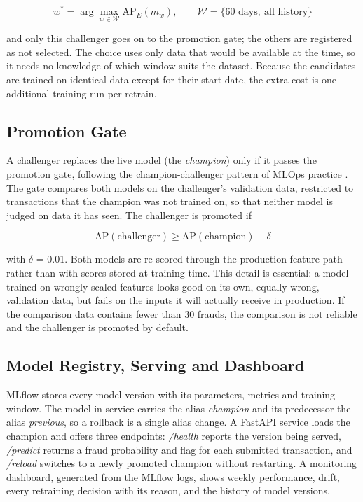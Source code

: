 \begin{equation}
  w^{*} = \arg\max_{w \in \mathcal{W}} \mathrm{AP}_{E}(m_w), \qquad \mathcal{W} = \{\text{60 days},\ \text{all history}\}
  \label{eq:select}
\end{equation}

and only this challenger goes on to the promotion gate; the others are registered as not selected. The choice uses only data that would be available at the time, so it needs no knowledge of which window suits the dataset. Because the candidates are trained on identical data except for their start date, the extra cost is one additional training run per retrain.

\subsection{Promotion Gate}\label{sec:gate}

A challenger replaces the live model (the \textit{champion}) only if it passes the promotion gate, following the champion-challenger pattern of MLOps practice \cite{pulicharla2019,kodakandla2024}. The gate compares both models on the challenger's validation data, restricted to transactions that the champion was not trained on, so that neither model is judged on data it has seen. The challenger is promoted if

\begin{equation}
  \mathrm{AP}(\text{challenger}) \ge \mathrm{AP}(\text{champion}) - \delta
  \label{eq:gate}
\end{equation}

with $\delta$ = 0.01. Both models are re-scored through the production feature path rather than with scores stored at training time. This detail is essential: a model trained on wrongly scaled features looks good on its own, equally wrong, validation data, but fails on the inputs it will actually receive in production. If the comparison data contains fewer than 30 frauds, the comparison is not reliable and the challenger is promoted by default.

\subsection{Model Registry, Serving and Dashboard}\label{sec:serving}

MLflow stores every model version with its parameters, metrics and training window. The model in service carries the alias \textit{champion} and its predecessor the alias \textit{previous}, so a rollback is a single alias change. A FastAPI service loads the champion and offers three endpoints: \textit{/health} reports the version being served, \textit{/predict} returns a fraud probability and flag for each submitted transaction, and \textit{/reload} switches to a newly promoted champion without restarting. A monitoring dashboard, generated from the MLflow logs, shows weekly performance, drift, every retraining decision with its reason, and the history of model versions.

